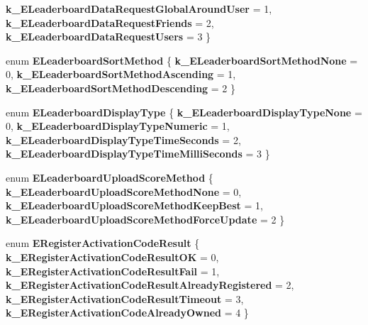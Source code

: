 \begin{DoxyCompactItemize}
{\bfseries k\+\_\+\+E\+Leaderboard\+Data\+Request\+Global\+Around\+User} = 1, 
{\bfseries k\+\_\+\+E\+Leaderboard\+Data\+Request\+Friends} = 2, 
{\bfseries k\+\_\+\+E\+Leaderboard\+Data\+Request\+Users} = 3
 \}
\item 
\mbox{\label{namespace_valve_1_1_steamworks_a5ce15f7c19ca21b76efd07e54d234153}} 
enum {\bfseries E\+Leaderboard\+Sort\+Method} \{ {\bfseries k\+\_\+\+E\+Leaderboard\+Sort\+Method\+None} = 0, 
{\bfseries k\+\_\+\+E\+Leaderboard\+Sort\+Method\+Ascending} = 1, 
{\bfseries k\+\_\+\+E\+Leaderboard\+Sort\+Method\+Descending} = 2
 \}
\item 
\mbox{\label{namespace_valve_1_1_steamworks_a32c8fd32150d5c70cdc99976acbf8a62}} 
enum {\bfseries E\+Leaderboard\+Display\+Type} \{ {\bfseries k\+\_\+\+E\+Leaderboard\+Display\+Type\+None} = 0, 
{\bfseries k\+\_\+\+E\+Leaderboard\+Display\+Type\+Numeric} = 1, 
{\bfseries k\+\_\+\+E\+Leaderboard\+Display\+Type\+Time\+Seconds} = 2, 
{\bfseries k\+\_\+\+E\+Leaderboard\+Display\+Type\+Time\+Milli\+Seconds} = 3
 \}
\item 
\mbox{\label{namespace_valve_1_1_steamworks_a6a2b9d374dbd2806430d5ed16e5731a2}} 
enum {\bfseries E\+Leaderboard\+Upload\+Score\+Method} \{ {\bfseries k\+\_\+\+E\+Leaderboard\+Upload\+Score\+Method\+None} = 0, 
{\bfseries k\+\_\+\+E\+Leaderboard\+Upload\+Score\+Method\+Keep\+Best} = 1, 
{\bfseries k\+\_\+\+E\+Leaderboard\+Upload\+Score\+Method\+Force\+Update} = 2
 \}
\item 
\mbox{\label{namespace_valve_1_1_steamworks_a8ffac8f17933f61d4e965d07681500f8}} 
enum {\bfseries E\+Register\+Activation\+Code\+Result} \{ \newline
{\bfseries k\+\_\+\+E\+Register\+Activation\+Code\+Result\+OK} = 0, 
{\bfseries k\+\_\+\+E\+Register\+Activation\+Code\+Result\+Fail} = 1, 
{\bfseries k\+\_\+\+E\+Register\+Activation\+Code\+Result\+Already\+Registered} = 2, 
{\bfseries k\+\_\+\+E\+Register\+Activation\+Code\+Result\+Timeout} = 3, 
\newline
{\bfseries k\+\_\+\+E\+Register\+Activation\+Code\+Already\+Owned} = 4
 \}
\item 
\mbox{\label{namespace_valve_1_1_steamworks_a993c473f27d237706a0af622b39f6b25}} 

\end{DoxyCompactItemize}
